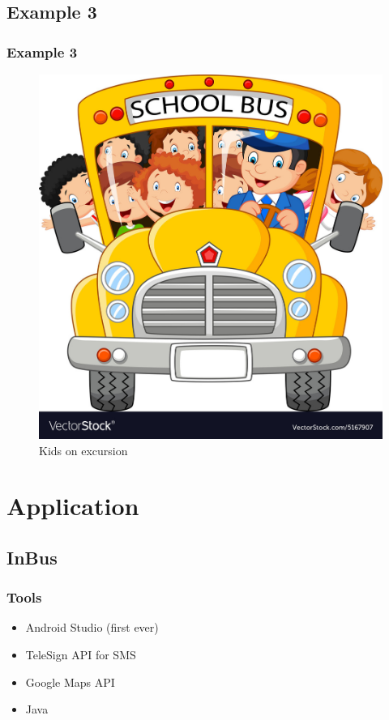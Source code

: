 \documentclass{beamer}
\begin{document}
\subsection{Example 3}
\begin{frame}\frametitle{Example 3}
\begin{figure}[h!]
   \begin{center}
   \includegraphics[scale=0.15]{school_bus.png}
   \end{center}
   \caption{Kids on excursion}
   \end{figure}
    
\end{frame}

\section{Application}
\subsection{InBus}
\begin{frame}\frametitle{Tools}
\begin{itemize}
   \item Android Studio (first ever)
   \item TeleSign API for SMS
   \item Google Maps API
   \item Java
 \end{itemize}    
\end{frame}
\end{document}
